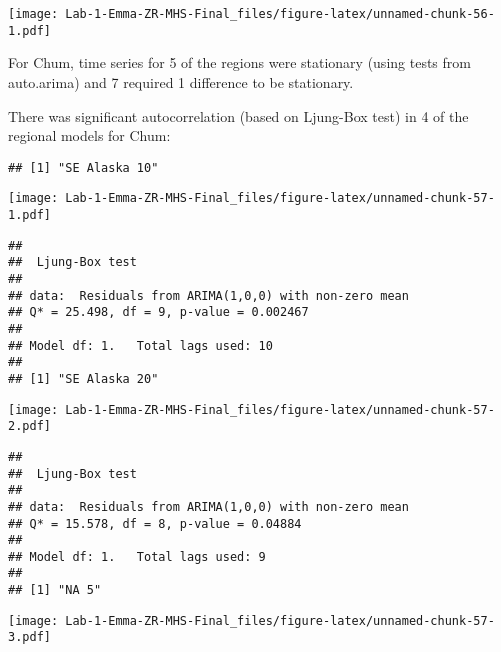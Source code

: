 \documentclass[
]{article}
\newenvironment{Shaded}{\begin{snugshade}}{\end{snugshade}}
\newcommand{\CommentTok}[1]{\textcolor[rgb]{0.56,0.35,0.01}{\textit{#1}}}
\newcommand{\ControlFlowTok}[1]{\textcolor[rgb]{0.13,0.29,0.53}{\textbf{#1}}}
\newcommand{\DecValTok}[1]{\textcolor[rgb]{0.00,0.00,0.81}{#1}}
\newcommand{\FunctionTok}[1]{\textcolor[rgb]{0.00,0.00,0.00}{#1}}
\newcommand{\NormalTok}[1]{#1}
\newcommand{\OtherTok}[1]{\textcolor[rgb]{0.56,0.35,0.01}{#1}}
\newcommand{\SpecialCharTok}[1]{\textcolor[rgb]{0.00,0.00,0.00}{#1}}
\begin{document}
\texttt{[image: Lab-1-Emma-ZR-MHS-Final\_files/figure-latex/unnamed-chunk-56-1.pdf]}

For Chum, time series for 5 of the regions were stationary (using tests
from auto.arima) and 7 required 1 difference to be stationary.

There was significant autocorrelation (based on Ljung-Box test) in 4 of
the regional models for Chum:

\begin{Shaded}
\end{Shaded}

\begin{verbatim}
## [1] "SE Alaska 10"
\end{verbatim}

\texttt{[image: Lab-1-Emma-ZR-MHS-Final\_files/figure-latex/unnamed-chunk-57-1.pdf]}

\begin{verbatim}
## 
##  Ljung-Box test
## 
## data:  Residuals from ARIMA(1,0,0) with non-zero mean
## Q* = 25.498, df = 9, p-value = 0.002467
## 
## Model df: 1.   Total lags used: 10
## 
## [1] "SE Alaska 20"
\end{verbatim}

\texttt{[image: Lab-1-Emma-ZR-MHS-Final\_files/figure-latex/unnamed-chunk-57-2.pdf]}

\begin{verbatim}
## 
##  Ljung-Box test
## 
## data:  Residuals from ARIMA(1,0,0) with non-zero mean
## Q* = 15.578, df = 8, p-value = 0.04884
## 
## Model df: 1.   Total lags used: 9
## 
## [1] "NA 5"
\end{verbatim}

\texttt{[image: Lab-1-Emma-ZR-MHS-Final\_files/figure-latex/unnamed-chunk-57-3.pdf]}
\end{document}
